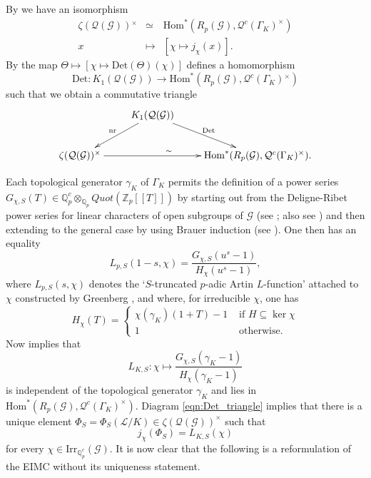 \documentclass[12pt]{amsart}
\theoremstyle{plain}
\theoremstyle{remark}
\theoremstyle{definition}
\numberwithin{equation}{section}
\begin{document}
By \cite[Proof of Theorem 8]{MR2114937} we have an isomorphism
\begin{eqnarray*}
\zeta(\mathcal{Q}(\mathcal{G})){^{\times}} & \simeq & 
{\mathrm{Hom}}^{\ast}(R_{p}(\mathcal{G}), \mathcal{Q}^{c}(\Gamma_{K})^{\times})\\
x & \mapsto & [\chi \mapsto j_{\chi}(x)].
\end{eqnarray*}
By \cite[Theorem 8]{MR2114937} the map $\Theta \mapsto [\chi \mapsto {\mathrm{Det}}(\Theta)(\chi)]$
defines a homomorphism
\[
{\mathrm{Det}}: K_{1}(\mathcal{Q}(\mathcal{G})) \rightarrow {\mathrm{Hom}}^{\ast}(R_p(\mathcal{G}), \mathcal{Q}^{c}(\Gamma_{K}){^{\times}})
\]
such that we obtain a commutative triangle
\begin{equation} \label{eqn:Det_triangle}
\xymatrix{
& K_{1}(\mathcal{Q}(\mathcal{G})) \ar[dl]_{\mathrm{nr}} \ar[dr]^{\mathrm{Det}} &\\
{\zeta(\mathcal{Q}(\mathcal{G}))^{\times}} \ar[rr]^{\sim} & & {{\mathrm{Hom}}^{\ast}(R_p( \mathcal{G}), \mathcal{Q}^{c}(\Gamma_{K})^{\times})}.}
\end{equation}

Each topological generator $\gamma_{K}$ of  $\Gamma_{K}$ permits the definition of a 
power series $G_{\chi,S}(T) \in {\mathbb{Q}}_{p}^{c} \otimes_{{\mathbb{Q}}_{p}} Quot({\mathbb{Z}}_{p}[[T]])$ 
by starting out from the Deligne-Ribet power series for linear characters of open subgroups 
of $\mathcal{G}$ (see \cite{MR579702}; also see \cite{ MR525346, MR524276}) 
and then extending to the general case by using Brauer induction (see \cite{MR692344}).
One then has an equality
\[
L_{p,S}(1-s,\chi) = \frac{G_{\chi,S}(u^s-1)}{H_{\chi}(u^s-1)},
\]
where $L_{p,S}(s,\chi)$ denotes the `$S$-truncated $p$-adic Artin $L$-function' attached to $\chi$ constructed by Greenberg \cite{MR692344},
and where, for irreducible $\chi$, one has
\[
H_{\chi}(T) = \left\{\begin{array}{ll} \chi(\gamma_{K})(1+T)-1 & \mbox{ if }  H \subseteq \ker \chi\\
1 & \mbox{ otherwise.}  \end{array}\right.
\]
Now \cite[Proposition 11]{MR2114937} implies that
\[
L_{K,S} : \chi \mapsto \frac{G_{\chi,S}(\gamma_{K}-1)}{H_{\chi}(\gamma_{K}-1)}
\]
is independent of the topological generator $\gamma_{K}$ and lies in 
${\mathrm{Hom}}^{\ast}(R_{p}( \mathcal{G}), \mathcal{Q}^{c}(\Gamma_{K})^{\times})$.
Diagram \eqref{eqn:Det_triangle} implies that there is a unique element 
$\Phi_{S} = \Phi_{S}(\mathcal{L}/K) \in \zeta(\mathcal{Q}(\mathcal{G}))^{\times}$
such that
\[
j_{\chi}(\Phi_{S}) = L_{K,S}(\chi)
\]
for every $\chi \in {\mathrm{Irr}}_{{\mathbb{Q}}_{p}^{c}}(\mathcal{G})$.
It is now clear that the following is a reformulation of the EIMC without its uniqueness statement.
\end{document}
